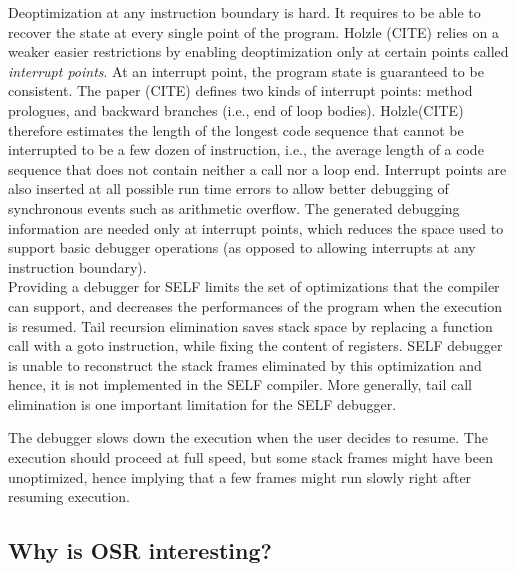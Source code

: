 Deoptimization at any instruction boundary is hard. 
It requires to be able to recover the state at every single point of the program.
Holzle (CITE) relies on a weaker easier restrictions by enabling deoptimization only at certain points called \textit{interrupt points}. 
At an interrupt point, the program state is guaranteed to be consistent. 
The paper (CITE) defines two kinds of interrupt points: method prologues, and backward branches (i.e., end of loop bodies).
Holzle(CITE) therefore estimates the length of the longest code sequence that cannot be interrupted to be a few dozen of instruction, i.e., the average length of a code sequence that does not contain neither a call nor a loop end.
Interrupt points are also inserted at all possible run time errors to allow better debugging of synchronous events such as arithmetic overflow. 
The generated debugging information are needed only at interrupt points, which reduces the space used to support basic debugger operations (as opposed to allowing interrupts at any instruction boundary).\\

Providing a debugger for SELF limits the set of optimizations that the compiler can support, and decreases the performances of the program when the execution is resumed. 
Tail recursion elimination saves stack space by replacing a function call with a goto instruction, while fixing the content of registers.
SELF debugger is unable to reconstruct the stack frames eliminated by this optimization and hence, it is not implemented in the SELF compiler.
More generally, tail call elimination is one important limitation for the SELF debugger.

The debugger slows down the execution when the user decides to resume. 
The execution should proceed at full speed, but some stack frames might have been unoptimized, hence implying that a few frames might run slowly right after resuming execution.\\

\subsection{Why is OSR interesting?}
\label{WhyOSRInteresting}
    
